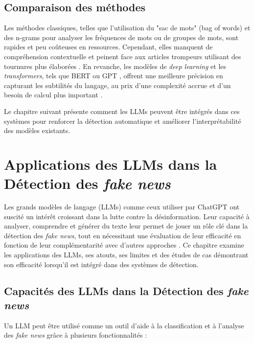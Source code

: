 \documentclass[a4paper,12pt, twocolumn]{article}
\begin{document}
\begin{twocolumn}
\subsection{Comparaison des méthodes}
Les méthodes classiques, telles que l'utilisation du "sac de mots" (bag of words) et des n-grams pour analyser les fréquences de mots ou de groupes de mots, sont rapides et peu coûteuses en ressources. Cependant, elles manquent de compréhension contextuelle et peinent face aux articles trompeurs utilisant des tournures plus élaborées \cite{conroy_automatic_2015}. En revanche, les modèles de \textit{deep learning} et les \textit{transformers}, tels que BERT \cite{kaliyar_fakebert_2021} ou GPT \cite{roumeliotis_fake_2025}, offrent une meilleure précision en capturant les subtilités du langage, au prix d’une complexité accrue et d’un besoin de calcul plus important \cite{singhania_3han_2017}.

\bigskip 
Le chapitre suivant présente comment les LLMs peuvent être intégrés dans ces systèmes pour renforcer la détection automatique et améliorer l’interprétabilité des modèles existants.

\section{Applications des LLMs dans la Détection des \textit{fake news}}
\label{chap:chatgpt_fake_news}

Les grands modèles de langage (LLMs) comme ceux utiliser par ChatGPT ont suscité un intérêt croissant dans la lutte contre la désinformation. Leur capacité à analyser, comprendre et générer du texte leur permet de jouer un rôle clé dans la détection des \textit{fake news}, tout en nécessitant une évaluation de leur efficacité en fonction de leur complémentarité avec d’autres approches \cite{hu_bad_2024}. Ce chapitre examine les applications des LLMs, ses atouts, ses limites et des études de cas démontrant son efficacité lorsqu'il est intégré dans des systèmes de détection.

\subsection{Capacités des LLMs dans la Détection des \textit{fake news}}
Un LLM peut être utilisé comme un outil d’aide à la classification et à l’analyse des \textit{fake news} grâce à plusieurs fonctionnalités :


\end{twocolumn}
\end{document}
